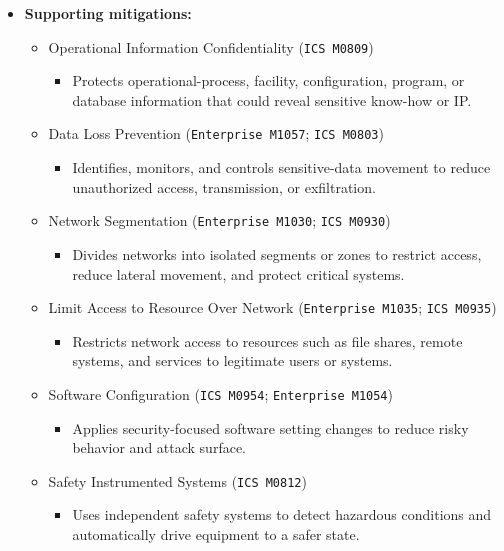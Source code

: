 \documentclass[10pt,a4paper,oneside]{report}
\begin{document}
\begin{itemize}
\item \textbf{Supporting mitigations:}
\begin{itemize}
\item Operational Information Confidentiality (\texttt{ICS M0809})
\begin{itemize}
\item Protects operational-process, facility, configuration, program, or database information that could reveal sensitive know-how or IP.
\end{itemize}
\item Data Loss Prevention (\texttt{Enterprise M1057}; \texttt{ICS M0803})
\begin{itemize}
\item Identifies, monitors, and controls sensitive-data movement to reduce unauthorized access, transmission, or exfiltration.
\end{itemize}
\item Network Segmentation (\texttt{Enterprise M1030}; \texttt{ICS M0930})
\begin{itemize}
\item Divides networks into isolated segments or zones to restrict access, reduce lateral movement, and protect critical systems.
\end{itemize}
\item Limit Access to Resource Over Network (\texttt{Enterprise M1035}; \texttt{ICS M0935})
\begin{itemize}
\item Restricts network access to resources such as file shares, remote systems, and services to legitimate users or systems.
\end{itemize}
\item Software Configuration (\texttt{ICS M0954}; \texttt{Enterprise M1054})
\begin{itemize}
\item Applies security-focused software setting changes to reduce risky behavior and attack surface.
\end{itemize}
\item Safety Instrumented Systems (\texttt{ICS M0812})
\begin{itemize}
\item Uses independent safety systems to detect hazardous conditions and automatically drive equipment to a safer state.
\end{itemize}
\end{itemize}
\end{itemize}
\end{document}
